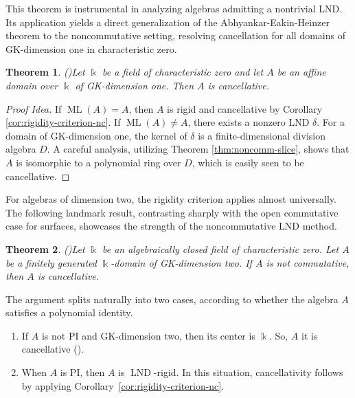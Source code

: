 \documentclass{amsart}
\theoremstyle{plain}
\newtheorem{theorem}{Theorem}
\numberwithin{theorem}{section}
\numberwithin{equation}{theorem}
\theoremstyle{definition}
\DeclareMathOperator{\LND}{LND}
\DeclareMathOperator{\ML}{ML}
\begin{document}
This theorem is instrumental in analyzing algebras admitting a nontrivial LND. Its application yields a direct generalization of the Abhyankar-Eakin-Heinzer theorem to the noncommutative setting, resolving cancellation for all domains of GK-dimension one in characteristic zero.

\begin{theorem} (\cite[Theorem 1.1]{BHHV})\label{thm:nc-curves-cancel}
Let $\Bbbk$ be a field of characteristic zero and let $A$ be an affine domain over $\Bbbk$ of GK-dimension one. Then $A$ is cancellative.
\end{theorem}

\begin{proof}[Proof Idea]
If $\ML(A)=A$, then $A$ is rigid and cancellative by Corollary \ref{cor:rigidity-criterion-nc}. If $\ML(A) \neq A$, there exists a nonzero LND $\delta$. For a domain of GK-dimension one, the kernel of $\delta$ is a finite-dimensional division algebra $D$. A careful analysis, utilizing Theorem \ref{thm:noncomm-slice}, shows that $A$ is isomorphic to a polynomial ring over $D$, which is easily seen to be cancellative.
\end{proof}

For algebras of dimension two, the rigidity criterion applies almost universally. The following landmark result, contrasting sharply with the open commutative case for surfaces, showcases the strength of the noncommutative LND method.

\begin{theorem} (\cite[Theorem 0.5]{BellZhang2017})\label{thm:nc-surfaces-cancel}
Let $\Bbbk$ be an algebraically closed field of characteristic zero. Let $A$ be a finitely generated $\Bbbk$-domain of GK-dimension two. If $A$ is not commutative, then $A$ is cancellative.
\end{theorem}

The argument splits naturally into two cases, according to whether the algebra $A$ satisfies a polynomial identity.

\begin{enumerate}
    \item If $A$ is not PI and GK-dimension two, then its center is $\Bbbk$. So, $A$ it is cancellative (\cite[Propostion 1.3]{BellZhang2017}).

    \item 
    When $A$ is PI, then $A$ is $\LND$-rigid. In this situation, cancellativity follows by applying Corollary~\ref{cor:rigidity-criterion-nc}.
\end{enumerate}
\end{document}
